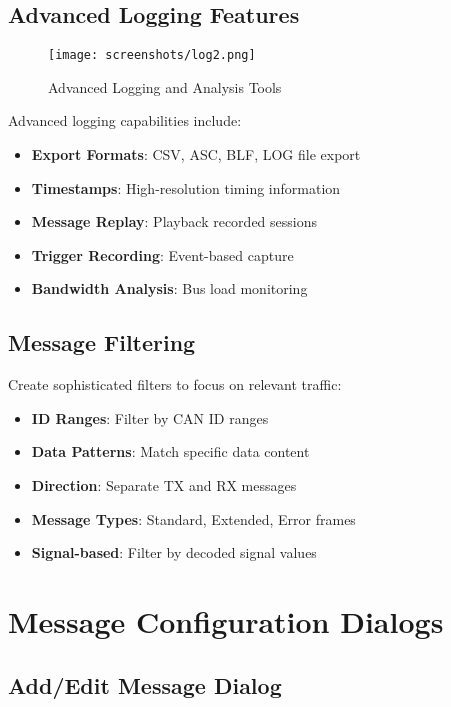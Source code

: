 \documentclass[11pt,a4paper]{article}
\begin{document}
\subsection{Advanced Logging Features}

\begin{figure}[H]
    \centering
    \texttt{[image: screenshots/log2.png]}
    \caption{Advanced Logging and Analysis Tools}
    \label{fig:log2}
\end{figure}

Advanced logging capabilities include:

\begin{itemize}
    \item \textbf{Export Formats}: CSV, ASC, BLF, LOG file export
    \item \textbf{Timestamps}: High-resolution timing information
    \item \textbf{Message Replay}: Playback recorded sessions
    \item \textbf{Trigger Recording}: Event-based capture
    \item \textbf{Bandwidth Analysis}: Bus load monitoring
\end{itemize}

\subsection{Message Filtering}

Create sophisticated filters to focus on relevant traffic:

\begin{itemize}
    \item \textbf{ID Ranges}: Filter by CAN ID ranges
    \item \textbf{Data Patterns}: Match specific data content
    \item \textbf{Direction}: Separate TX and RX messages
    \item \textbf{Message Types}: Standard, Extended, Error frames
    \item \textbf{Signal-based}: Filter by decoded signal values
\end{itemize}

\section{Message Configuration Dialogs}

\subsection{Add/Edit Message Dialog}
\end{document}

